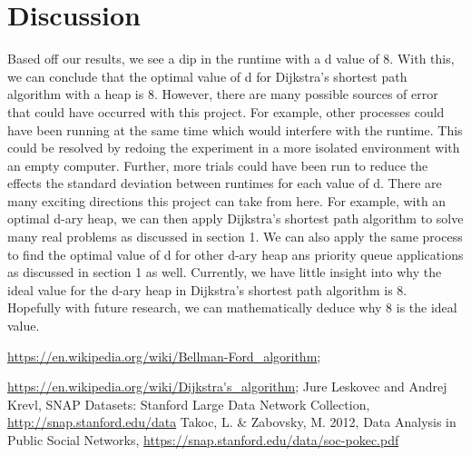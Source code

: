 \documentclass[a4paper,10pt]{article}
\begin{document}
\section{Discussion}
Based off our results, we see a dip in the runtime with a d value of 8. With this, we can conclude that the optimal value of d for Dijkstra's shortest path algorithm with a heap is 8. \smallbreak
However, there are many possible sources of error that could have occurred with this project. For example, other processes could have been running at the same time which would interfere with the runtime. This could be resolved by redoing the experiment in a more isolated environment with an empty computer. Further, more trials could have been run to reduce the effects the standard deviation between runtimes for each value of d.  \smallbreak
There are many exciting directions this project can take from here. For example, with an optimal d-ary heap, we can then apply Dijkstra's shortest path algorithm to solve many real problems as discussed in section 1. We can also apply the same process to find the optimal value of d for other d-ary heap ans priority queue applications as discussed in section 1 as well. Currently, we have little insight into why the ideal value for the d-ary heap in Dijkstra's shortest path algorithm is 8. Hopefully with future research, we can mathematically deduce why 8 is the ideal value.

\begin{thebibliography}{}
    \url{https://en.wikipedia.org/wiki/Bellman-Ford_algorithm};

    \url{https://en.wikipedia.org/wiki/Dijkstra's_algorithm};
    Jure Leskovec and Andrej Krevl,
    SNAP Datasets: Stanford Large Data Network Collection,
    \url{http://snap.stanford.edu/data}
    Takoc, L. \& Zabovsky, M. 2012,
       Data Analysis in Public Social Networks,
       \url{https://snap.stanford.edu/data/soc-pokec.pdf}
\end{thebibliography}
\end{document}
